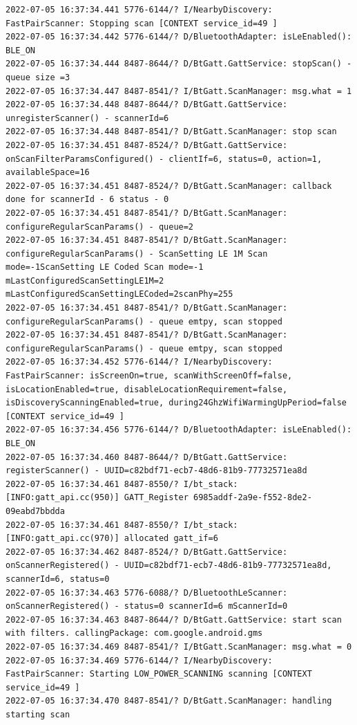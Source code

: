 \documentclass[a4paper,12pt]{book}
\begin{document}
\begin{lstlisting}
2022-07-05 16:37:34.441 5776-6144/? I/NearbyDiscovery: FastPairScanner: Stopping scan [CONTEXT service_id=49 ]
2022-07-05 16:37:34.442 5776-6144/? D/BluetoothAdapter: isLeEnabled(): BLE_ON
2022-07-05 16:37:34.444 8487-8644/? D/BtGatt.GattService: stopScan() - queue size =3
2022-07-05 16:37:34.447 8487-8541/? I/BtGatt.ScanManager: msg.what = 1
2022-07-05 16:37:34.448 8487-8644/? D/BtGatt.GattService: unregisterScanner() - scannerId=6
2022-07-05 16:37:34.448 8487-8541/? D/BtGatt.ScanManager: stop scan
2022-07-05 16:37:34.451 8487-8524/? D/BtGatt.GattService: onScanFilterParamsConfigured() - clientIf=6, status=0, action=1, availableSpace=16
2022-07-05 16:37:34.451 8487-8524/? D/BtGatt.ScanManager: callback done for scannerId - 6 status - 0
2022-07-05 16:37:34.451 8487-8541/? D/BtGatt.ScanManager: configureRegularScanParams() - queue=2
2022-07-05 16:37:34.451 8487-8541/? D/BtGatt.ScanManager: configureRegularScanParams() - ScanSetting LE 1M Scan mode=-1ScanSetting LE Coded Scan mode=-1 mLastConfiguredScanSettingLE1M=2 mLastConfiguredScanSettingLECoded=2scanPhy=255
2022-07-05 16:37:34.451 8487-8541/? D/BtGatt.ScanManager: configureRegularScanParams() - queue emtpy, scan stopped
2022-07-05 16:37:34.451 8487-8541/? D/BtGatt.ScanManager: configureRegularScanParams() - queue emtpy, scan stopped
2022-07-05 16:37:34.452 5776-6144/? I/NearbyDiscovery: FastPairScanner: isScreenOn=true, scanWithScreenOff=false, isLocationEnabled=true, disableLocationRequirement=false, isDiscoveryScanningEnabled=true, during24GhzWifiWarmingUpPeriod=false [CONTEXT service_id=49 ]
2022-07-05 16:37:34.456 5776-6144/? D/BluetoothAdapter: isLeEnabled(): BLE_ON
2022-07-05 16:37:34.460 8487-8644/? D/BtGatt.GattService: registerScanner() - UUID=c82bdf71-ecb7-48d6-81b9-77732571ea8d
2022-07-05 16:37:34.461 8487-8550/? I/bt_stack: [INFO:gatt_api.cc(950)] GATT_Register 6985addf-2a9e-f552-8de2-09eabd7bbdda
2022-07-05 16:37:34.461 8487-8550/? I/bt_stack: [INFO:gatt_api.cc(970)] allocated gatt_if=6
2022-07-05 16:37:34.462 8487-8524/? D/BtGatt.GattService: onScannerRegistered() - UUID=c82bdf71-ecb7-48d6-81b9-77732571ea8d, scannerId=6, status=0
2022-07-05 16:37:34.463 5776-6088/? D/BluetoothLeScanner: onScannerRegistered() - status=0 scannerId=6 mScannerId=0
2022-07-05 16:37:34.463 8487-8644/? D/BtGatt.GattService: start scan with filters. callingPackage: com.google.android.gms
2022-07-05 16:37:34.469 8487-8541/? I/BtGatt.ScanManager: msg.what = 0
2022-07-05 16:37:34.469 5776-6144/? I/NearbyDiscovery: FastPairScanner: Starting LOW_POWER_SCANNING scanning [CONTEXT service_id=49 ]
2022-07-05 16:37:34.470 8487-8541/? D/BtGatt.ScanManager: handling starting scan

\end{lstlisting}
\end{document}
